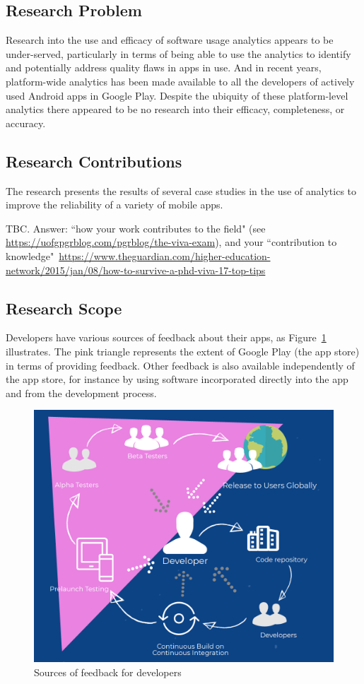 \subsection{Research Problem}
Research into the use and efficacy of software usage analytics appears to be under-served, particularly in terms of being able to use the analytics to identify and potentially address quality flaws in apps in use. And in recent years, platform-wide analytics has been made available to all the developers of actively used Android apps in Google Play. Despite the ubiquity of these platform-level analytics there appeared to be no research into their efficacy, completeness, or accuracy.


\subsection{Research Contributions}
The research presents the results of several case studies in the use of analytics to improve the reliability of a variety of mobile apps.

TBC. Answer: ``how your work contributes to the field" (see \url{https://uofgpgrblog.com/pgrblog/the-viva-exam}), and your ``contribution to knowledge"~\url{https://www.theguardian.com/higher-education-network/2015/jan/08/how-to-survive-a-phd-viva-17-top-tips}

\subsection{Research Scope}
Developers have various sources of feedback about their apps, as Figure~\ref{fig:sources-of-feedback-for-developers} illustrates. The pink triangle represents the extent of Google Play (the app store) in terms of providing feedback. Other feedback is also available independently of the app store, for instance by using software incorporated directly into the app and from the development process.

\begin{figure}[ht]
    \centering
    \includegraphics[width=13cm]{images/silvias-developer-centric-figure-mobilesoft2020.png}
    \caption{Sources of feedback for developers}
    \label{fig:sources-of-feedback-for-developers}
\end{figure}

